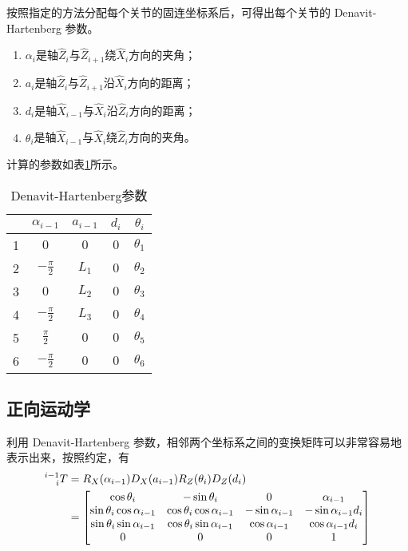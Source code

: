 \documentclass{ctexart}
\begin{document}
按照指定的方法分配每个关节的固连坐标系后，可得出每个关节的 Denavit-Hartenberg 参数。
\begin{enumerate}
    \item $\alpha_i$是轴$\hat Z_i$与$\hat Z_{i+1}$绕$\hat X_i$方向的夹角；
    \item $a_i$是轴$\hat Z_i$与$\hat Z_{i+1}$沿$\hat X_i$方向的距离；
    \item $d_i$是轴$\hat X_{i-1}$与$\hat X_i$沿$\hat Z_i$方向的距离；
    \item $\theta_i$是轴$\hat X_{i-1}$与$\hat X_i$绕$\hat Z_i$方向的夹角。
\end{enumerate}
计算的参数如表\ref{tab:DH-params}所示。

\begin{table}[ht]
    \caption{Denavit-Hartenberg参数}
    \label{tab:DH-params}
    \centering
    \begin{tabular}{c|cccc}
        \hline
        & $\alpha_{i-1}$ & $a_{i-1}$ & $d_i$ & $\theta_i$ \\
        \hline
        1 & $0$ & $0$ & $0$ & $\theta_1$ \\
        2 & $-\frac{\pi}{2}$ & $L_1$ & $0$ & $\theta_2$ \\
        3 & $0$ & $L_2$ & $0$ & $\theta_3$ \\
        4 & $-\frac{\pi}{2}$ & $L_3$ & $0$ & $\theta_4$\\
        5 & $\frac{\pi}{2}$ & $0$ & $0$ & $\theta_5$\\
        6 & $-\frac{\pi}{2}$ & $0$ & $0$ & $\theta_6$\\ \hline
    \end{tabular}
\end{table}

\subsection{正向运动学}

利用 Denavit-Hartenberg 参数，相邻两个坐标系之间的变换矩阵可以非常容易地表示出来，按照约定，有
\[ 
    \begin{aligned}
        \prescript{i-1}{i}{T} 
        &= R_X (\alpha_{i-1}) D_X (a_{i-1}) R_Z (\theta_i) D_Z (d_i) \\
        &= \begin{bmatrix}
            \cos \theta_i & - \sin \theta_i & 0 & \alpha_{i-1} \\
            \sin \theta_i \cos \alpha_{i-1} & \cos \theta_i \cos \alpha_{i-1} & - \sin \alpha_{i-1} & - \sin \alpha_{i-1} d_i \\
            \sin \theta_i \sin \alpha_{i-1} & \cos \theta_i \sin \alpha_{i-1} & \cos \alpha_{i-1} & \cos \alpha_{i-1} d_i \\
            0 & 0 & 0 & 1
        \end{bmatrix}
    \end{aligned}
\]
\end{document}
